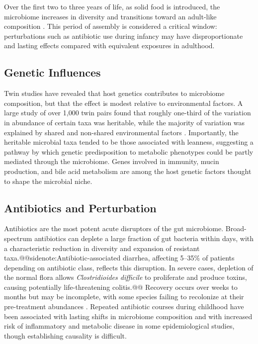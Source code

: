 \documentclass{tufte-handout}
\makeatletter
\def\sidenote#1{@@sidenote:#1@@}
\makeatother
\begin{document}
Over the first two to three years of life, as solid food is introduced, the microbiome increases in diversity and transitions toward an adult-like composition \citep{backhedDynamicsInfantGut2015}. This period of assembly is considered a critical window: perturbations such as antibiotic use during infancy may have disproportionate and lasting effects compared with equivalent exposures in adulthood.

\subsection{Genetic Influences}

Twin studies have revealed that host genetics contributes to microbiome composition, but that the effect is modest relative to environmental factors. A large study of over 1,000 twin pairs found that roughly one-third of the variation in abundance of certain taxa was heritable, while the majority of variation was explained by shared and non-shared environmental factors \citep{goodrichHumanGeneticsShape2014}. Importantly, the heritable microbial taxa tended to be those associated with leanness, suggesting a pathway by which genetic predisposition to metabolic phenotypes could be partly mediated through the microbiome.  Genes involved in immunity, mucin production, and bile acid metabolism are among the host genetic factors thought to shape the microbial niche. 

\subsection{Antibiotics and Perturbation}

Antibiotics are the most potent acute disruptors of the gut microbiome. Broad-spectrum antibiotics can deplete a large fraction of gut bacteria within days, with a characteristic reduction in diversity and expansion of resistant taxa.\sidenote{Antibiotic-associated diarrhea, affecting 5--35\% of patients depending on antibiotic class, reflects this disruption. In severe cases, depletion of the normal flora allows \textit{Clostridioides difficile}\index{Clostridioides difficile} to proliferate and produce toxins, causing potentially life-threatening colitis.} Recovery occurs over weeks to months but may be incomplete, with some species failing to recolonize at their pre-treatment abundances \citep{dethlefsenIncompleteRecoveryGut2011}. Repeated antibiotic courses during childhood have been associated with lasting shifts in microbiome composition and with increased risk of inflammatory and metabolic disease in some epidemiological studies, though establishing causality is difficult.
\end{document}
